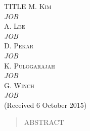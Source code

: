 \documentclass[12pt,notitlepage,twoside]{article}
\begin{document}
  
       
       
        \thispagestyle{empty}
        \pagestyle{fancy}
        \cfoot{}
        \renewcommand{\headrulewidth}{0pt}
        \lhead[\thepage]{}
        \rhead[]{\thepage}
        
        
        \begin{center}
                \huge
                \textsc{TITLE}
                {\large\centering
                        \newline
                        \newline
                        \textsc{M. Kim\\}
                        \textit{\footnotesize JOB\\}
                        \large
                        \textsc{A. Lee\\}
                        \textit{\footnotesize JOB\\}
                        \large
                        \textsc{D. Pekar\\}
                        \textit{\footnotesize JOB\\}
                        \large
                        \textsc{K. Pulogarajah\\}
                        \textit{\footnotesize JOB\\}
                        \large
                        \textsc{G. Winch\\}
                        \textit{\footnotesize JOB\\}
                        \vspace{3mm}
                        \footnotesize
                        (Received 6 October 2015)\\}
        \end{center}
        
        
        \footnotesize
        \begin{quotation}
                \addtolength{\oddsidemargin}{-.875in}
                \addtolength{\evensidemargin}{-.875in}
                \addtolength{\textwidth}{1.75in}
                \addtolength{\topmargin}{-.875in}
                \addtolength{\textheight}{1.75in}
	               ABSTRACT
        \end{quotation}
        
\end{document}
